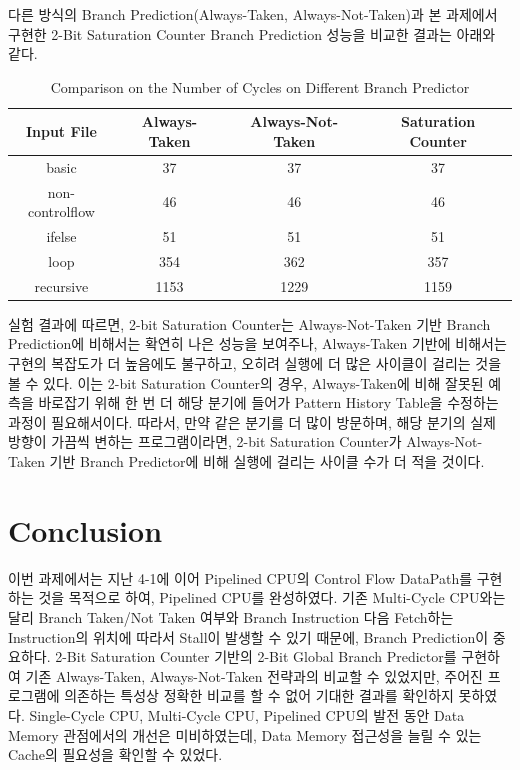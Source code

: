 \documentclass[openright, a4paper]{article}
\begin{document}
다른 방식의 Branch Prediction(Always-Taken, Always-Not-Taken)과 본 과제에서 구현한 2-Bit Saturation Counter Branch Prediction 성능을 비교한 결과는 아래와 같다.

\begin{table}[!h]
  \centering
  \begin{tabular}{@{}cccc@{}}
    \hline
    Input File & Always-Taken & Always-Not-Taken & Saturation Counter \\
    \hline
    basic & 37 & 37 & 37 \\
    non-controlflow & 46 & 46 & 46 \\
    ifelse & 51 & 51 & 51 \\
    loop & 354 & 362 & 357 \\
    recursive & 1153 & 1229 & 1159 \\
    \hline
  \end{tabular}
  \caption{Comparison on the Number of Cycles on Different Branch Predictor}
  \label{tab:comparison}
\end{table}

\hfill

실험 결과에 따르면, 2-bit Saturation Counter는 Always-Not-Taken 기반 Branch
Prediction에 비해서는 확연히 나은 성능을 보여주나, Always-Taken 기반에 비해서는
구현의 복잡도가 더 높음에도 불구하고, 오히려 실행에 더 많은 사이클이 걸리는
것을 볼 수 있다. 이는 2-bit Saturation Counter의 경우, Always-Taken에 비해 잘못된
예측을 바로잡기 위해 한 번 더 해당 분기에 들어가 Pattern History Table을 수정하는
과정이 필요해서이다. 따라서, 만약 같은 분기를 더 많이 방문하며, 해당 분기의 실제
방향이 가끔씩 변하는 프로그램이라면, 2-bit Saturation Counter가 Always-Not-Taken
기반 Branch Predictor에 비해 실행에 걸리는 사이클 수가 더 적을 것이다.


\section{Conclusion}

이번 과제에서는 지난 4-1에 이어 Pipelined CPU의 Control Flow DataPath를 구현하는 것을 목적으로 하여, Pipelined CPU를 완성하였다.
기존 Multi-Cycle CPU와는 달리 Branch Taken/Not Taken 여부와 Branch Instruction 다음 Fetch하는 Instruction의 위치에 따라서 Stall이 발생할 수 있기 때문에, Branch Prediction이 중요하다.
2-Bit Saturation Counter 기반의 2-Bit Global Branch Predictor를 구현하여 기존 Always-Taken, Always-Not-Taken 전략과의 비교할 수 있었지만, 주어진 프로그램에 의존하는 특성상 정확한 비교를 할 수 없어 기대한 결과를 확인하지 못하였다.
Single-Cycle CPU, Multi-Cycle CPU, Pipelined CPU의 발전 동안 Data Memory 관점에서의 개선은 미비하였는데, Data Memory 접근성을 늘릴 수 있는 Cache의 필요성을 확인할 수 있었다.
\end{document}
